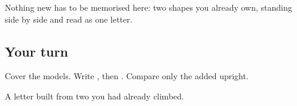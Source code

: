 Nothing new has to be memorised here: two shapes you already own, standing side by side and read as one letter.

\subsection*{Your turn}
Cover the models. Write \textbf{}, then \textbf{}. Compare only the added upright.

\begin{tcolorbox}[breakable,colback=teal!4,colframe=teal!35!black,title={Before you move on}]
A letter built from two you had already climbed.
\end{tcolorbox}
